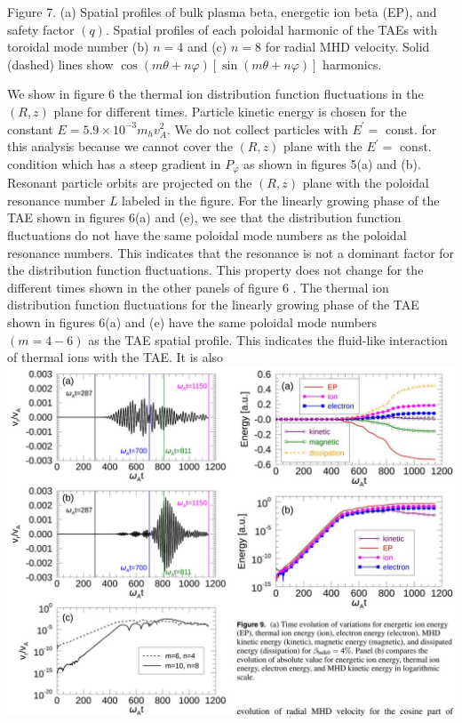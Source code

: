 \documentclass[10pt]{article}
\begin{document}
Figure 7. (a) Spatial profiles of bulk plasma beta, energetic ion beta (EP), and safety factor $(q)$. Spatial profiles of each poloidal harmonic of the TAEs with toroidal mode number (b) $n=4$ and (c) $n=8$ for radial MHD velocity. Solid (dashed) lines show $\cos (m \theta+n \varphi)[\sin (m \theta+n \varphi)]$ harmonics.

We show in figure 6 the thermal ion distribution function fluctuations in the $(R, z)$ plane for different times. Particle kinetic energy is chosen for the constant $E=5.9 \times 10^{-3} m_{h} v_{A}^{2}$. We do not collect particles with $E^{\prime}=$ const. for this analysis because we cannot cover the $(R, z)$ plane with the $E^{\prime}=$ const. condition which has a steep gradient in $P_{\varphi}$ as shown in figures 5(a) and (b). Resonant particle orbits are projected on the $(R, z)$ plane with the poloidal resonance number $L$ labeled in the figure. For the linearly growing phase of the TAE shown in figures 6(a) and (e), we see that the distribution function fluctuations do not have the same poloidal mode numbers as the poloidal resonance numbers. This indicates that the resonance is not a dominant factor for the distribution function fluctuations. This property does not change for the different times shown in the other panels of figure 6 . The thermal ion distribution function fluctuations for the linearly growing phase of the TAE shown in figures 6(a) and (e) have the same poloidal mode numbers $(m=4-6)$ as the TAE spatial profile. This indicates the fluid-like interaction of thermal ions with the TAE. It is also
\includegraphics[max width=\textwidth, center]{2023_06_04_de2f4b8aa3fd859f006dg-10}
\end{document}
